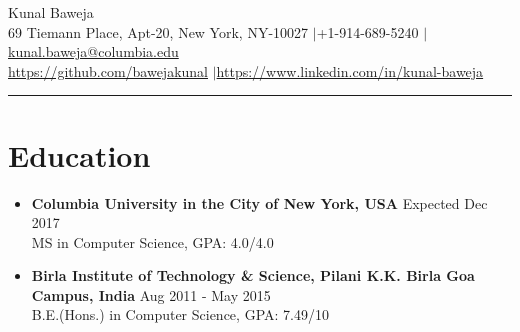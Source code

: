 \documentclass{article}
\def\name{Kunal Baweja}
\begin{document}
\begin{center}
{\huge \name}\\
69 Tiemann Place, Apt-20, New York, NY-10027 $|$\hspace{3pt}+1-914-689-5240 $|$\hspace{3pt}\href{mailto:kunal.baweja@columbia.edu}{kunal.baweja@columbia.edu}\\
\vspace{2pt}
\href{https://github.com/bawejakunal}{https://github.com/bawejakunal} $|$\hspace{3pt}\href{https://www.linkedin.com/in/kunal-baweja}{https://www.linkedin.com/in/kunal-baweja}
\end{center}

\hrule
\vspace{5pt}

\section*{Education}
\begin{itemize}
    \item \textbf{Columbia University in the City of New York, USA} {\hfill Expected Dec 2017}\\
    MS in Computer Science, GPA: 4.0/4.0
    
    \item \textbf{Birla Institute of Technology \& Science, Pilani K.K. Birla Goa Campus, India} {\hfill Aug 2011 - May 2015}\\
    B.E.(Hons.) in Computer Science, GPA: 7.49/10

\end{itemize}
\end{document}
